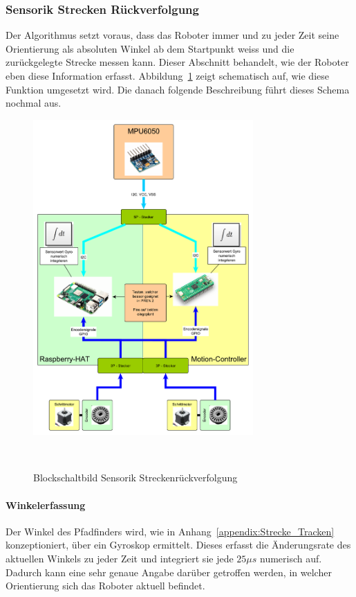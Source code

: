 \documentclass[main.tex]{subfiles} %
\begin{document}

\subsubsection{Sensorik Strecken Rückverfolgung}

Der Algorithmus setzt voraus, dass das Roboter immer und zu jeder Zeit seine
Orientierung als absoluten Winkel ab dem Startpunkt weiss und die zurückgelegte
Strecke messen kann. Dieser Abschnitt behandelt, wie der Roboter eben diese
Information erfasst. Abbildung~\ref{fig:Blockschaltbild_StreckenTracken} zeigt
schematisch auf, wie diese Funktion umgesetzt wird. Die danach folgende
Beschreibung führt dieses Schema nochmal aus.

\begin{figure}[H]
    \centering
    \includegraphics[width=0.75\textwidth]{./fig_Strecke_Tracken/Topologie_MPU6050.pdf}
    \caption{Blockschaltbild Sensorik Streckenrückverfolgung}~\label{fig:Blockschaltbild_StreckenTracken}
\end{figure}

\paragraph{Winkelerfassung}
Der Winkel des Pfadfinders wird, wie in Anhang~\ref{appendix:Strecke_Tracken}
konzeptioniert, über ein Gyroskop ermittelt. Dieses erfasst die Änderungsrate
des aktuellen Winkels zu jeder Zeit und integriert sie jede $25\mu s$ numerisch
auf. Dadurch kann eine sehr genaue Angabe darüber getroffen werden, in welcher
Orientierung sich das Roboter aktuell befindet.
\end{document}
